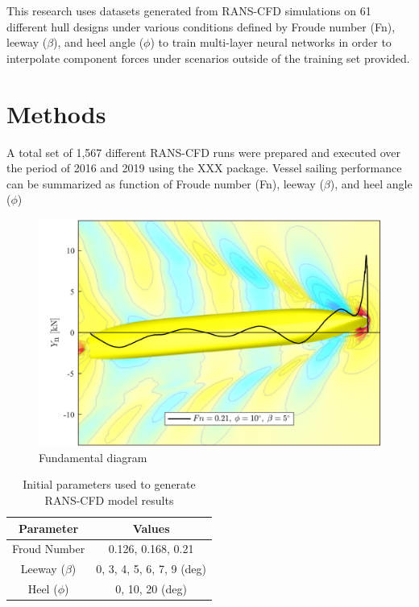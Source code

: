 \documentclass[twoside,twocolumn]{article}
\begin{document}
This research uses datasets generated from RANS-CFD simulations on 61 different hull designs under various conditions defined by Froude number (Fn), leeway ($\beta$), and heel angle ($\phi$) to train multi-layer neural networks in order to interpolate component forces under scenarios outside of the training set provided. 


\section{Methods}
A total set of 1,567 different RANS-CFD runs were prepared and executed over the period of 2016 and 2019 using the XXX package. 
Vessel sailing performance can be summarized as function of Froude number (Fn), leeway ($\beta$), and heel angle ($\phi$)

\begin{figure}[]
\centering
\includegraphics[width=\columnwidth]{images/hull1.png}  %
\caption{Fundamental diagram }
\label{fig:hull1}
\end{figure}


\begin{table}[]
\centering
\caption{Initial parameters used to generate RANS-CFD model results}
\label{tab:parameters}
\begin{tabular}{@{}cc@{}}
\toprule
\textbf{Parameter} & \textbf{Values} \\ \midrule
Froud Number & 0.126, 0.168, 0.21 \\
Leeway ($\beta$) & 0, 3, 4, 5, 6, 7, 9 (deg) \\
Heel ($\phi$) & 0, 10, 20 (deg) \\ \bottomrule
\end{tabular}
\end{table}
\end{document}
